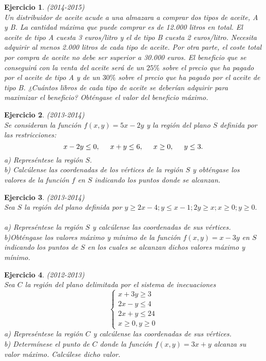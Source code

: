 \documentclass[12pt, a4paper]{amsart}
\newtheorem{ejer}{Ejercicio}
\begin{document}
\begin{ejer}\em (2014-2015)\\
Un distribuidor de aceite acude a una almazara a comprar dos tipos de aceite, A y B. La cantidad máxima que puede comprar es de 12.000 litros en total. El aceite de tipo A cuesta 3 euros/litro y el de tipo B cuesta 2 euros/litro. Necesita adquirir al menos 2.000 litros de cada tipo de aceite. Por otra parte, el coste total por compra de aceite no debe ser superior a 30.000 euros. El beneficio que se conseguirá con la venta del aceite será de un $25\%$ sobre el precio que ha pagado por el aceite de tipo A y de un $30\%$ sobre el precio que ha pagado por el aceite de tipo B. ¿Cuántos libros de cada tipo de aceite se deberían adquirir para maximizar el beneficio? Obténgase el valor del beneficio máximo.
\end{ejer}


\begin{ejer}\em (2013-2014)\\
Se consideran la función $f(x,y)=5x-2y$ y la región del plano $S$ definida por las restricciones:
\[x-2y\leq 0,\hspace*{0.5cm} x+y\leq 6,\hspace*{0.5cm} x\geq 0,\hspace*{0.5cm} y\leq 3.\]
a) Represéntese la región $S.$\\
b) Calcúlense las coordenadas de los vértices de la región $S$ y obténgase los valores de la función $f$ en $S$ indicando los puntos donde se alcanzan.
\end{ejer}

\begin{ejer}\em  (2013-2014)\\
Sea $S$ la región del plano definida por
$y\geq 2x-4; y\leq x-1; 2y\geq x; x\geq 0; y\geq 0.$\\\\
a) Represéntese la región $S$ y calcúlense las coordenadas de sus vértices.\\
b)Obténgase los valores máximo y mínimo de la función $f(x,y)=x-3y$ en $S$ indicando los puntos de $S$ en los cuales se alcanzan dichos valores máximo y mínimo.
\end{ejer}

\begin{ejer}\em (2012-2013)\\
Sea $C$ la región del plano delimitada por el sistema de inecuaciones
\begin{equation*}
\left \{ \begin{matrix} x+3y\geq 3
\\ 2x-y\leq 4
\\ 2x+y\leq 24
\\ x\geq 0, y\geq 0 \end{matrix}\right. 
\end{equation*}
a) Represéntese la región $C$ y calcúlense las coordenadas de sus vértices.\\
b) Determínese el punto de $C$ donde la función $f(x,y)=3x+y$ alcanza su valor máximo. Calcúlese dicho valor.
\end{ejer}
\end{document}
